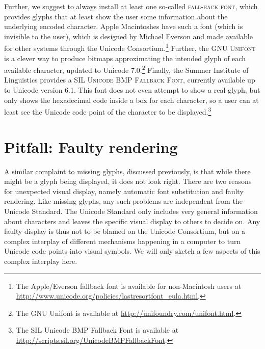 Further, we suggest to always install at least one so-called \textsc{fall-back
font}, which provides glyphs that at least show the user some information about
the underlying encoded character. Apple Macintoshes have such a font (which is
invisible to the user), which is designed by Michael Everson and made available
for other systems through the Unicode Consortium.\footnote{The Apple/Everson
fallback font is available for non-Macintosh users at \newline
\url{http://www.unicode.org/policies/lastresortfont\_eula.html}.} Further, the
\textsc{GNU Unifont} is a clever way to produce bitmaps approximating the
intended glyph of each available character, updated to Unicode 7.0.\footnote{The
GNU Unifont is available at \url{http://unifoundry.com/unifont.html}.} Finally,
the Summer Institute of Linguistics provides a \textsc{SIL Unicode BMP Fallback
Font}, currently available up to Unicode version 6.1. This font does not even
attempt to show a real glyph, but only shows the hexadecimal code inside a box
for each character, so a user can at least see the Unicode code point of the
character to be displayed.\footnote{The SIL Unicode BMP Fallback Font is
available at \newline \url{http://scripts.sil.org/UnicodeBMPFallbackFont}.}

\section{Pitfall: Faulty rendering}
\label{pitfall-faulty-rendering}

A similar complaint to missing glyphs, discussed previously, is that while there
might be a glyph being displayed, it does not look right. There are two
reasons for unexpected visual display, namely automatic font substitution and
faulty rendering. Like missing glyphs, any such problems are independent from
the Unicode Standard. The Unicode Standard only includes very general
information about characters and leaves the specific visual display to others to
decide on. Any faulty display is thus not to be blamed on the Unicode
Consortium, but on a complex interplay of different mechanisms happening in a
computer to turn Unicode code points into visual symbols. We will only sketch a
few aspects of this complex interplay here.

